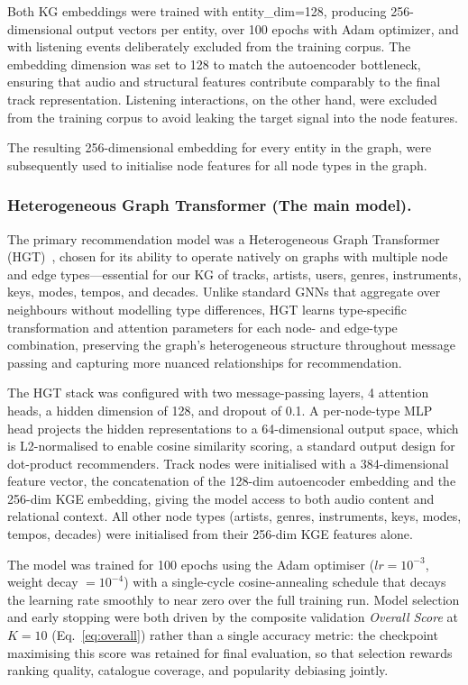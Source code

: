 Both KG embeddings were trained with entity\_dim=128, producing 256-dimensional output vectors per entity, over 100 epochs with Adam optimizer, and with listening events deliberately excluded from the training corpus. The embedding dimension was set to 128 to match the autoencoder bottleneck, ensuring that audio and structural features contribute comparably to the final track representation. Listening interactions, on the other hand, were excluded from the training corpus to avoid leaking the target signal into the node features.

The resulting 256-dimensional embedding for every entity in the graph, were subsequently used to initialise node features for all node types in the graph.

\subsubsection{Heterogeneous Graph Transformer (The main model).}

The primary recommendation model was a Heterogeneous Graph Transformer (HGT)~\cite{hu2020hgt}, chosen for its ability to operate natively on graphs with multiple node and edge types---essential for our KG of tracks, artists, users, genres, instruments, keys, modes, tempos, and decades. Unlike standard GNNs that aggregate over neighbours without modelling type differences, HGT learns type-specific transformation and attention parameters for each node- and edge-type combination, preserving the graph's heterogeneous structure throughout message passing and capturing more nuanced relationships for recommendation.

The HGT stack was configured with two message-passing layers, 4 attention heads, a hidden dimension of 128, and dropout of 0.1. A per-node-type MLP head projects the hidden representations to a 64-dimensional output space, which is L2-normalised to enable cosine similarity scoring, a standard output design for dot-product recommenders. Track nodes were initialised with a 384-dimensional feature vector, the concatenation of the 128-dim autoencoder embedding and the 256-dim KGE embedding, giving the model access to both audio content and relational context. All other node types (artists, genres, instruments, keys, modes, tempos, decades) were initialised from their 256-dim KGE features alone.

The model was trained for 100 epochs using the Adam optimiser
($lr = 10^{-3}$, weight decay $=10^{-4}$) with a single-cycle
cosine-annealing schedule that decays the learning rate smoothly to
near zero over the full training run. Model selection and early
stopping were both driven by the composite validation \emph{Overall
Score} at $K{=}10$ (Eq.~\ref{eq:overall}) rather than a single accuracy
metric: the checkpoint maximising this score was retained for final
evaluation, so that selection rewards ranking quality, catalogue
coverage, and popularity debiasing jointly.

